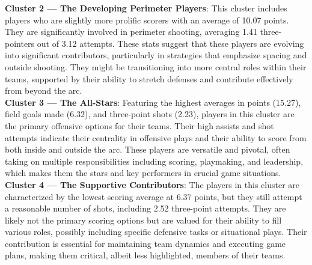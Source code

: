 \documentclass[fleqn,10pt]{SelfArx} %
\begin{document}
\textbf{Cluster 2 --- The Developing Perimeter Players}: This cluster includes players who are slightly more prolific scorers with an average of 10.07 points. They are significantly involved in perimeter shooting, averaging 1.41 three-pointers out of 3.12 attempts. These stats suggest that these players are evolving into significant contributors, particularly in strategies that emphasize spacing and outside shooting. They might be transitioning into more central roles within their teams, supported by their ability to stretch defenses and contribute effectively from beyond the arc.	\\
\textbf{Cluster 3 --- The All-Stars}: Featuring the highest averages in points (15.27), field goals made (6.32), and three-point shots (2.23), players in this cluster are the primary offensive options for their teams. Their high assists and shot attempts indicate their centrality in offensive plays and their ability to score from both inside and outside the arc. These players are versatile and pivotal, often taking on multiple responsibilities including scoring, playmaking, and leadership, which makes them the stars and key performers in crucial game situations.\\
\textbf{Cluster 4 --- The Supportive Contributors}: The players in this cluster are characterized by the lowest scoring average at 6.37 points, but they still attempt a reasonable number of shots, including 2.52 three-point attempts. They are likely not the primary scoring options but are valued for their ability to fill various roles, possibly including specific defensive tasks or situational plays. Their contribution is essential for maintaining team dynamics and executing game plans, making them critical, albeit less highlighted, members of their teams.
\end{document}
